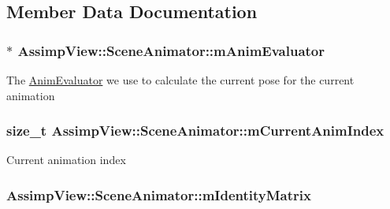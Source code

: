 \subsection{Member Data Documentation}
\hypertarget{class_assimp_view_1_1_scene_animator_a833e91d8a9b56837f20d0c80100ff63a}{
\subsubsection[{m\+Anim\+Evaluator}]{$\ast$ Assimp\+View\+::\+Scene\+Animator\+::m\+Anim\+Evaluator\hspace{0.3cm}{\ttfamily [protected]}}}\label{class_assimp_view_1_1_scene_animator_a833e91d8a9b56837f20d0c80100ff63a}
The \hyperlink{class_assimp_view_1_1_anim_evaluator}{Anim\+Evaluator} we use to calculate the current pose for the current animation \hypertarget{class_assimp_view_1_1_scene_animator_a4305f48bc7e66229f416838f0b8e49b0}{
\subsubsection[{m\+Current\+Anim\+Index}]{\setlength{\rightskip}{0pt plus 5cm}size\+\_\+t Assimp\+View\+::\+Scene\+Animator\+::m\+Current\+Anim\+Index\hspace{0.3cm}{\ttfamily [protected]}}}\label{class_assimp_view_1_1_scene_animator_a4305f48bc7e66229f416838f0b8e49b0}
Current animation index \hypertarget{class_assimp_view_1_1_scene_animator_a76d6c3f6a84b52919ca645f3af7623a5}{
\subsubsection[{m\+Identity\+Matrix}]{ Assimp\+View\+::\+Scene\+Animator\+::m\+Identity\+Matrix\hspace{0.3cm}{\ttfamily [protected]}}}\label{class_assimp_view_1_1_scene_animator_a76d6c3f6a84b52919ca645f3af7623a5}

